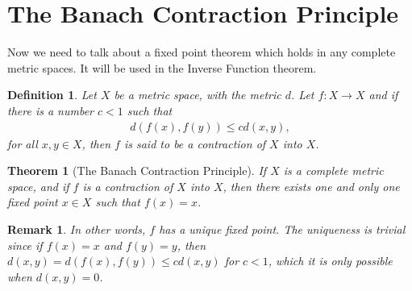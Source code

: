 \documentclass[10pt]{book}
\newtheorem{definition}{Definition}[chapter]
\newtheorem{theorem}{Theorem}[chapter]
\newtheorem{remark}{Remark}[chapter]
\theoremstyle{definition}
\numberwithin{equation}{chapter}
\begin{document}
\medskip




\section{The Banach Contraction Principle}

Now we need to talk about a fixed point theorem which holds in any complete metric spaces. It will be used in the Inverse Function theorem.

\medskip

\begin{definition}
Let $X$ be a metric space, with the metric $d$. Let $f: X \to X$ and if there is a number $c < 1$ such that 
\begin{align}\label{def_711_equ1}
    d(f(x),f(y)) \leq c d(x,y),
\end{align}
for all $x,y \in X$, then $f$ is said to be a contraction of $X$ into $X$. 
\end{definition}

\medskip

\begin{theorem}[The Banach Contraction Principle]\label{th_710}
If $X$ is a complete metric space, and if $f$ is a contraction of $X$ into $X$, then there exists one and only one fixed point $x \in X$ such that $f(x) = x$.
\end{theorem}

\begin{remark}
In other words, $f$ has a unique fixed point. The uniqueness is trivial since if $f(x) = x$ and $f(y) = y$, then $d(x,y) = d(f(x),f(y)) \leq c d(x,y)$ for $c < 1$, which it is only possible when $d(x,y) = 0$.
\end{remark}
\end{document}
